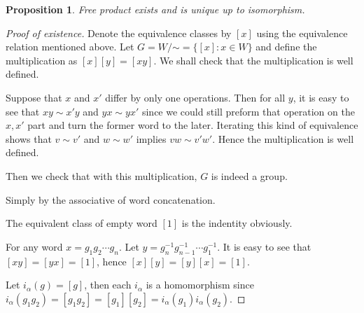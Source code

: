 \documentclass[a4paper,titlepage]{article}
\theoremstyle{remark}
\theoremstyle{definition}
\theoremstyle{definition}
\theoremstyle{plain}
\newtheorem{proposition}{Proposition}
\begin{document}
  \begin{proposition}
    Free product exists and is unique up to isomorphism.
  \end{proposition}

  \begin{proof}[Proof of existence]
    Denote the equivalence classes by $[x]$ using the equivalence relation mentioned above.
    Let $G = W\!/\mathord\sim = \big\{ [x] : x \in W \big\}$ and define the multiplication as 
    $[x][y] = [xy]$. We shall check that the multiplication is well defined.

    Suppose that $x$ and $x'$ differ by only one operations. Then for all $y$, it is easy to 
    see that $xy \sim x'y$ and $yx \sim yx'$ since we could still preform that 
    operation on the $x, x'$ part and turn the former word to the later. Iterating this
    kind of equivalence shows that $v \sim v'$ and $w \sim w'$ implies $vw \sim v'w'$. Hence 
    the multiplication is well defined.

    Then we check that with this multiplication, $G$ is indeed a group.
    \begin{description}[style=standard]
      \item[associative:] Simply by the associative of word concatenation.
      \item[indentity:] The equivalent class of empty word $[1]$ is the indentity obviously.
      \item[inverse:] For any word $x = g_1 g_2 \cdots g_n$. Let $y = g^{-1}_n g^{-1}_{n-1} \cdots g^{-1}_1$.
        It is easy to see that $[xy] = [yx] = [1]$, hence $[x][y] = [y][x] = [1]$.
    \end{description}
    Let $i_\alpha(g) = [g]$, then each $i_\alpha$ is a homomorphism since $i_\alpha(g_1 g_2) = [g_1 g_2]
    = [g_1] [g_2] = i_\alpha(g_1) i_\alpha(g_2)$.


\end{proof}
\end{document}

